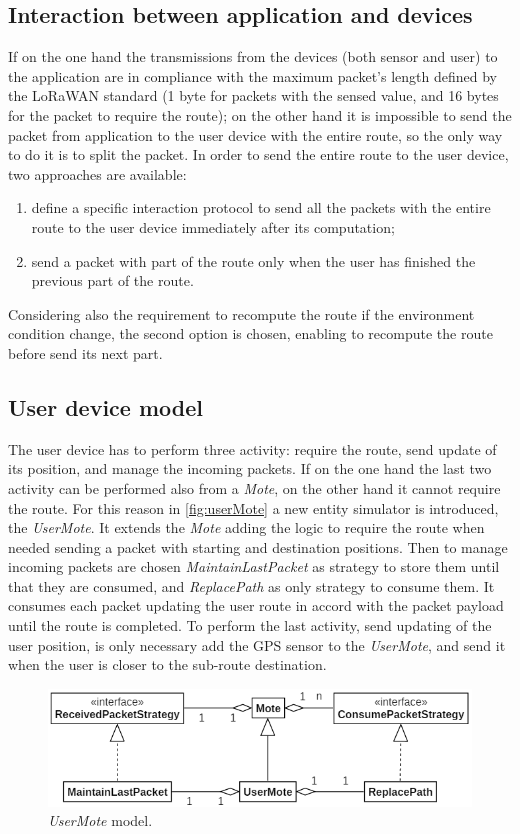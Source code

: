 \subsection*{Interaction between application and devices}
If on the one hand the transmissions from the devices (both sensor and user) to the application are in compliance with the maximum packet's length defined by the LoRaWAN standard (1 byte for packets with the sensed value, and 16 bytes for the packet to require the route); on the other hand it is impossible to send the packet from application to the user device with the entire route, so the only way to do it is to split the packet.
In order to send the entire route to the user device, two approaches are available: 
\begin{enumerate}
    \item define a specific interaction protocol to send all the packets with the entire route to the user device immediately after its computation;
    \item send a packet with part of the route only when the user has finished the previous part of the route.
\end{enumerate}
Considering also the requirement to recompute the route if the environment condition change, the second option is chosen, enabling to recompute the route before send its next part.

\subsection*{User device model}
The user device has to perform three activity: require the route, send update of its position, and manage the incoming packets.
If on the one hand the last two activity can be performed also from a \textit{Mote}, on the other hand it cannot require the route.
For this reason in \autoref{fig:userMote} a new entity simulator is introduced, the \textit{UserMote}. 
It extends the \textit{Mote} adding the logic to require the route when needed sending a packet with starting and destination positions.
Then to manage incoming packets are chosen \textit{MaintainLastPacket} as strategy to store them until that they are consumed, and \textit{ReplacePath} as only strategy to consume them.
It consumes each packet updating the user route in accord with the packet payload until the route is completed.
To perform the last activity, send updating of the user position, is only necessary add the GPS sensor to the \textit{UserMote}, and send it when the user is closer to the sub-route destination.
% 
\begin{figure}[h]
    \centering
    \includegraphics{figures/userMote.png}
    \caption[\textit{UserMote} model (case study 1)]{\textit{UserMote} model.}
    \label{fig:userMote}
\end{figure}
% 

